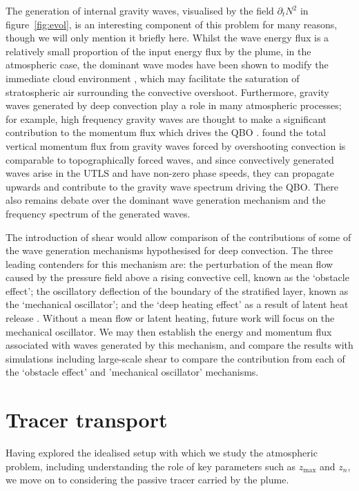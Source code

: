 \documentclass[a4paper]{article}
\begin{document}
The generation of internal gravity waves, visualised by the field $\partial_t N^2$ in figure~\ref{fig:evol},
is an interesting component of this problem for many reasons, though we will only mention it briefly here.
Whilst the wave energy flux is a relatively small proportion of the input energy flux by the plume, in the
atmospheric case, the dominant wave modes have been shown to modify the immediate cloud environment
\citep{lane2001}, which may facilitate the saturation of stratospheric air surrounding the convective
overshoot. Furthermore, gravity waves generated by deep convection play a role in many atmospheric processes;
for example, high frequency gravity waves are thought to make a significant contribution to the momentum flux
which drives the QBO \citep{baldwin2001}. \citet{flynn2004} found the total vertical momentum flux from
gravity waves forced by overshooting convection is comparable to topographically forced waves, and since
convectively generated waves arise in the UTLS and have non-zero phase speeds, they can propagate upwards and
contribute to the gravity wave spectrum driving the QBO. There also remains debate over the dominant wave
generation mechanism and the frequency spectrum of the generated waves. 

The introduction of shear would allow comparison of the contributions of some of the 
wave generation mechanisms hypothesised for deep convection. The three leading contenders for this 
mechanism are: the perturbation of the mean flow caused by the pressure field above a rising convective cell,
known as the `obstacle effect'; the oscillatory deflection of the boundary of the stratified layer, known as
the `mechanical oscillator'; and the `deep heating effect' as a result of latent heat release
\citep{flynn2004}. Without a mean flow or latent heating, future work will focus on the mechanical oscillator.
We may then establish the energy and momentum flux associated with waves generated by this mechanism, and
compare the results with simulations including large-scale shear to compare the contribution from each of the
`obstacle effect' and 'mechanical oscillator' mechanisms.


\section{Tracer transport}
\label{sec:tracertransport}
Having explored the idealised setup with which we study the atmospheric problem, including understanding the
role of key parameters such as $z_{\max}$ and $z_n$, we move on to considering the passive tracer carried by
the plume. 
\end{document}
